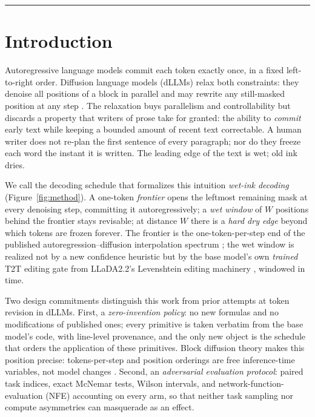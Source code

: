 \documentclass[11pt,a4paper]{article}
\begin{document}
\vspace{0.4em}
\noindent\rule{\textwidth}{0.5pt}
\vspace{0.8em}

\section{Introduction}\label{sec:intro}

Autoregressive language models commit each token exactly once, in a fixed left-to-right
order. Diffusion language models (dLLMs) relax both constraints: they denoise all
positions of a block in parallel and may rewrite any still-masked position at any step
\citep{llada,dream7b,llada22mini}. The relaxation buys parallelism and controllability
but discards a property that writers of prose take for granted: the ability to
\emph{commit} early text while keeping a bounded amount of recent text correctable. A
human writer does not re-plan the first sentence of every paragraph; nor do they freeze
each word the instant it is written. The leading edge of the text is wet; old ink dries.

We call the decoding schedule that formalizes this intuition \emph{wet-ink decoding}
(Figure~\ref{fig:method}). A one-token \emph{frontier} opens the leftmost remaining
mask at every denoising step, committing it autoregressively; a \emph{wet window} of
$W$ positions behind the frontier stays revisable; at distance $W$ there is a
\emph{hard dry edge} beyond which tokens are frozen forever. The frontier is the
one-token-per-step end of the published autoregression--diffusion interpolation
spectrum \citep{bd3lm,setdiffusion}; the wet window is realized not by a new
confidence heuristic but by the base model's own \emph{trained} T2T editing gate from
LLaDA2.2's Levenshtein editing machinery \citep{llada22mini,llada21}, windowed in time.

Two design commitments distinguish this work from prior attempts at token revision in
dLLMs. First, a \emph{zero-invention policy}: no new formulas and no modifications of
published ones; every primitive is taken verbatim from the base model's code, with
line-level provenance, and the only new object is the schedule that orders the
application of these primitives. Block diffusion theory makes this position precise:
tokens-per-step and position orderings are free inference-time variables, not model
changes \citep{bd3lm,setdiffusion}. Second, an \emph{adversarial evaluation protocol}:
paired task indices, exact McNemar tests, Wilson intervals, and network-function-evaluation
(NFE) accounting on every arm, so that neither task sampling nor compute asymmetries
can masquerade as an effect.
\end{document}
